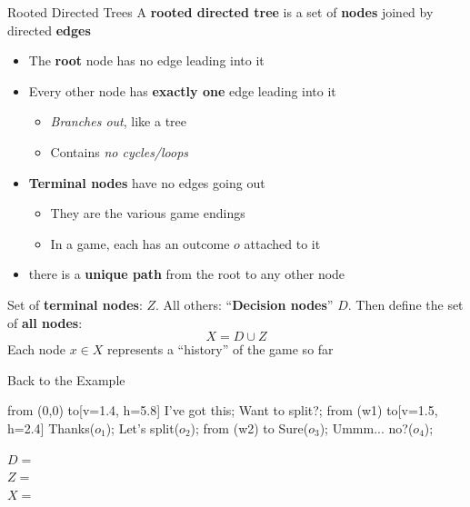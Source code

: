 \begin{frame}{Rooted Directed Trees}
A \textbf{rooted directed tree} is a set of \textbf{nodes} joined by directed \textbf{edges}
\bsk
\begin{itemize}
    \item The \textbf{root} node has no edge leading into it
    \item Every other node has \textbf{exactly one} edge leading into it
    \begin{itemize}
        \item \textit{Branches out}, like a tree
        \item Contains \textit{no cycles/loops}
    \end{itemize}
    \item \textbf{Terminal nodes} have no edges going out
    \begin{itemize}
        \item They are the various game endings
        \item In a game, each has an outcome $o$ attached to it
    \end{itemize}
    \item there is a \textbf{unique path} from the root to any other node
\end{itemize}
\bsk
Set of \textbf{terminal nodes}: $Z$. All others: ``\textbf{Decision nodes}'' $D$. Then define the set of \textbf{all nodes}:
$$X = D\cup Z$$
Each node $x\in X$ represents a ``history'' of the game so far

\end{frame}

\begin{frame}{Back to the Example}
\begin{center}
\begin{gametree}[player names={Alex, Blair}, scale=0.82]
  \branch[player=1, root=w, label=90] from (0,0) to[v=1.4, h=5.8]
    {I've got this; Want to split?};
  \branch[player=2, label=135] from (w1) to[v=1.5, h=2.4]
    {Thanks($o_1$); Let's split($o_2$)};
  \branch[label=45] from (w2) to {Sure($o_3$); Ummm... no?($o_4$)};
\end{gametree}    
\end{center}
\bsk
$D=$\\
$Z=$\\
$X=$
\end{frame}


